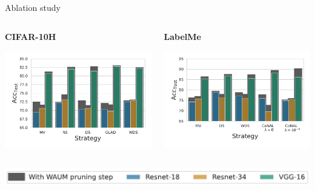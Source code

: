 \begin{frame}{Ablation study}{}
    \begin{columns}
        \begin{column}{.5\textwidth}
            \textbf{CIFAR-10H}

            \vspace{.25cm}

            \centering
               \includegraphics[width=\textwidth]{../chapters/images/acc_cifar10H.pdf}

            \end{column}

            \begin{column}{.5\textwidth}
                \textbf{LabelMe}

                \vspace{.25cm}

                \centering
                   \includegraphics[width=\textwidth]{../chapters/images/acc_labelme.pdf}
            \end{column}

        \end{columns}
    \centering
    \includegraphics[width=.75\textwidth]{../chapters/images/legend_ablation_study.pdf}
\end{frame}

